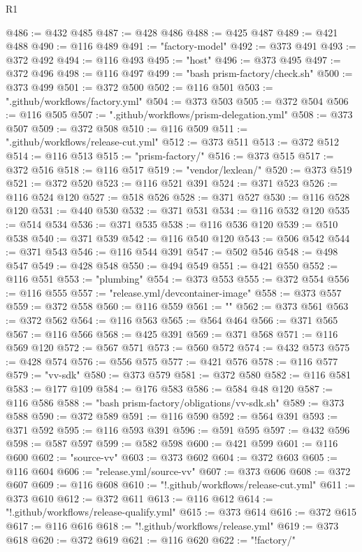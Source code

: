\begin{lexlean}{R1}
\begin{coremodule}
@486 := @432 @485
@487 := @428 @486
@488 := @425 @487
@489 := @421 @488
@490 := @116 @489
@491 := "factory-model"
@492 := @373 @491
@493 := @372 @492
@494 := @116 @493
@495 := "host"
@496 := @373 @495
@497 := @372 @496
@498 := @116 @497
@499 := "bash prism-factory/check.sh"
@500 := @373 @499
@501 := @372 @500
@502 := @116 @501
@503 := ".github/workflows/factory.yml"
@504 := @373 @503
@505 := @372 @504
@506 := @116 @505
@507 := ".github/workflows/prism-delegation.yml"
@508 := @373 @507
@509 := @372 @508
@510 := @116 @509
@511 := ".github/workflows/release-cut.yml"
@512 := @373 @511
@513 := @372 @512
@514 := @116 @513
@515 := "prism-factory/"
@516 := @373 @515
@517 := @372 @516
@518 := @116 @517
@519 := "vendor/lexlean/"
@520 := @373 @519
@521 := @372 @520
@523 := @116 @521 @391
@524 := @371 @523
@526 := @116 @524 @120
@527 := @518 @526
@528 := @371 @527
@530 := @116 @528 @120
@531 := @440 @530
@532 := @371 @531
@534 := @116 @532 @120
@535 := @514 @534
@536 := @371 @535
@538 := @116 @536 @120
@539 := @510 @538
@540 := @371 @539
@542 := @116 @540 @120
@543 := @506 @542
@544 := @371 @543
@546 := @116 @544 @391
@547 := @502 @546
@548 := @498 @547
@549 := @428 @548
@550 := @494 @549
@551 := @421 @550
@552 := @116 @551
@553 := "plumbing"
@554 := @373 @553
@555 := @372 @554
@556 := @116 @555
@557 := "release.yml/devcontainer-image"
@558 := @373 @557
@559 := @372 @558
@560 := @116 @559
@561 := ""
@562 := @373 @561
@563 := @372 @562
@564 := @116 @563
@565 := @564 @464
@566 := @371 @565
@567 := @116 @566
@568 := @425 @391
@569 := @371 @568
@571 := @116 @569 @120
@572 := @567 @571
@573 := @560 @572
@574 := @432 @573
@575 := @428 @574
@576 := @556 @575
@577 := @421 @576
@578 := @116 @577
@579 := "vv-sdk"
@580 := @373 @579
@581 := @372 @580
@582 := @116 @581
@583 := @177 @109
@584 := @176 @583
@586 := @584 @48 @120
@587 := @116 @586
@588 := "bash prism-factory/obligations/vv-sdk.sh"
@589 := @373 @588
@590 := @372 @589
@591 := @116 @590
@592 := @564 @391
@593 := @371 @592
@595 := @116 @593 @391
@596 := @591 @595
@597 := @432 @596
@598 := @587 @597
@599 := @582 @598
@600 := @421 @599
@601 := @116 @600
@602 := "source-vv"
@603 := @373 @602
@604 := @372 @603
@605 := @116 @604
@606 := "release.yml/source-vv"
@607 := @373 @606
@608 := @372 @607
@609 := @116 @608
@610 := "!.github/workflows/release-cut.yml"
@611 := @373 @610
@612 := @372 @611
@613 := @116 @612
@614 := "!.github/workflows/release-qualify.yml"
@615 := @373 @614
@616 := @372 @615
@617 := @116 @616
@618 := "!.github/workflows/release.yml"
@619 := @373 @618
@620 := @372 @619
@621 := @116 @620
@622 := "!factory/"

\end{coremodule}
\end{lexlean}
